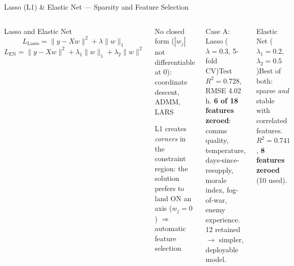 \documentclass[aspectratio=169,10pt,t]{beamer}
\begin{document}
\begin{frame}{Lasso (L1) \& Elastic Net --- Sparsity and Feature Selection}
\begin{columns}[T]
\begin{fbx}{Lasso and Elastic Net}\[L_{\text{Lasso}}=\|y-Xw\|^{2}+\lambda\|w\|_{1}\]\[L_{\text{EN}}=\|y-Xw\|^{2}+\lambda_1\|w\|_1+\lambda_2\|w\|^{2}\]\end{fbx}
\begin{tl}\item No closed form ($|w_j|$ not differentiable at 0): coordinate descent, ADMM, LARS\item L1 creates \emph{corners} in the constraint region: the solution prefers to land ON an axis ($w_j=0$) $\Rightarrow$ automatic feature selection\end{tl}
\begin{cbox}[ISSAgrn]{Case A: Lasso ($\lambda=0.3$, 5-fold CV)}\scriptsize Test $R^2=0.728$, RMSE 4.02 h. \textbf{6 of 18 features zeroed}: comms quality, temperature, days-since-resupply, morale index, fog-of-war, enemy experience. 12 retained $\to$ simpler, deployable model.\end{cbox}
\begin{cbox}[ISSAnavy]{Elastic Net ($\lambda_1=0.2$, $\lambda_2=0.5$)}\scriptsize Best of both: sparse \emph{and} stable with correlated features. $R^2=0.741$, \textbf{8 features zeroed} (10 used).\end{cbox}
\end{columns}
\end{frame}
\end{document}
